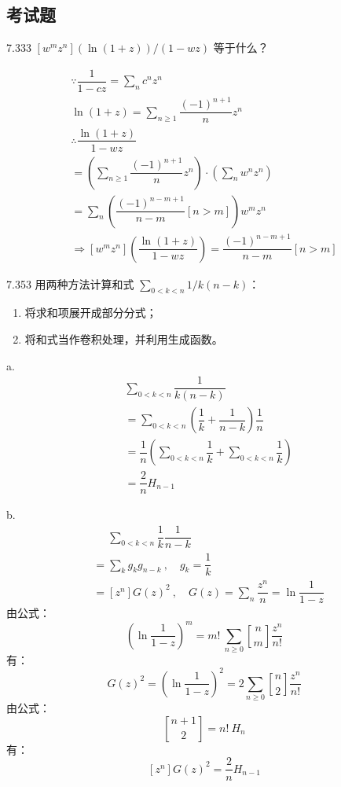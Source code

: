 \subsection{考试题}

\begin{problem}{7.33}{3}
  \( [w^m z^n] (\ln{(1+z)}) / (1-wz) \) 等于什么？
\end{problem}

\begin{gather*}
  \because \dfrac{1}{1-cz} = \sum_n c^n z^n \\
  \ln{(1+z)} = \sum_{n \geqslant 1} \dfrac{(-1)^{n+1}}{n} z^n \\
  \therefore \dfrac{\ln{(1+z)}}{1-wz} \\
  = \left( \sum_{n \geqslant 1} \dfrac{(-1)^{n+1}}{n} z^n \right) \cdot \left( \sum_n w^n z^n \right) \\
  = \sum_n \left( \dfrac{(-1)^{n-m+1}}{n-m} [n > m] \right) w^m z^n \\
  \Rightarrow [w^m z^n] \left( \dfrac{\ln{(1+z)}}{1-wz} \right) = \dfrac{(-1)^{n-m+1}}{n-m} [n > m]
\end{gather*}

\begin{problem}{7.35}{3}
  用两种方法计算和式 \( \sum_{0 < k < n} 1 / k (n-k) \)：
  \begin{enumerate}
    \item[a] 将求和项展开成部分分式；
    \item[b] 将和式当作卷积处理，并利用生成函数。
  \end{enumerate}
\end{problem}

a.
\begin{align*}
  & \sum_{0 < k < n} \dfrac{1}{k(n-k)} \\
  &= \sum_{0 < k < n} \left( \dfrac{1}{k} + \dfrac{1}{n-k} \right) \dfrac{1}{n} \\
  &= \dfrac{1}{n} \left( \sum_{0 < k < n} \dfrac{1}{k} + \sum_{0 < k < n} \dfrac{1}{k} \right) \\
  &= \dfrac{2}{n} H_{n-1}
\end{align*}

b.
\begin{align*}
  &\phantom{=} \sum_{0 < k < n} \dfrac{1}{k} \dfrac{1}{n-k} \\
  &= \sum_k g_k g_{n-k} \ , \quad g_k = \dfrac{1}{k} \\
  &= [z^n] G(z)^2 \ , \quad G(z) = \sum_n \dfrac{z^n}{n} = \ln{\dfrac{1}{1-z}}
\end{align*}
由公式：
\[
  \boxed{\left( \ln{\dfrac{1}{1-z}} \right)^m = m! \ \sum_{n \geqslant 0} \genfrac{[}{]}{0pt}{} {n}{m} \dfrac{z^n}{n!}}
\]
有：
\[
  G(z)^2 = \left( \ln{\dfrac{1}{1-z}} \right)^2 = 2 \sum_{n \geqslant 0} \genfrac{[}{]}{0pt}{} {n}{2} \dfrac{z^n}{n!}
\]
由公式：
\[
  \boxed{\genfrac{[}{]}{0pt}{} {n+1}{2} = n! \ H_{n}}
\]
有：
\[
  [z^n] G(z)^2 = \dfrac{2}{n} H_{n-1}
\]

